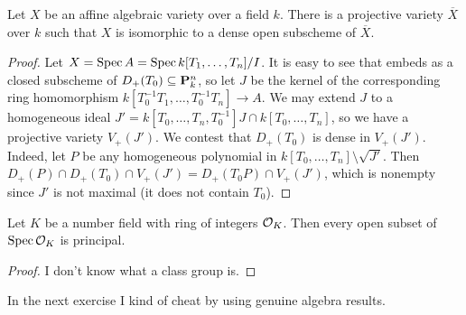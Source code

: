 \begin{exer}
	Let $X$ be an affine algebraic variety over a field $k$. There is a
	projective variety $\overline{X}$ over $k$ such that $X$ is isomorphic
	to a dense open subscheme of $\overline{X}$.
\end{exer}
\begin{proof}
	Let $X = \operatorname{Spec} A = \operatorname{Spec} k[T_1,\ldots,T_n]/I$. It is easy to see that
	embeds as a closed subscheme of $D_+(T_0) \subseteq \mathbf{P}^n_k$, so let
	$J$ be the kernel of the corresponding ring homomorphism
	$k[T_0^{-1}T_1,\ldots,T_0^{-1}T_n] \to A$. We may extend $J$ to a
	homogeneous ideal $J' = k[T_0,\ldots,T_n,T_0^{-1}]J \cap
	k[T_0,\ldots,T_n]$, so we have a projective variety $V_+(J')$. We
	contest that $D_+(T_0)$ is dense in $V_+(J')$. Indeed, let $P$ be any
	homogeneous polynomial in $k[T_0,\ldots,T_n]\setminus\sqrt{J'}$. Then
	$D_+(P) \cap D_+(T_0) \cap V_+(J') = D_+(T_0P) \cap V_+(J')$, which is
	nonempty since $J'$ is not maximal (it does not contain $T_0$).
\end{proof}

\begin{exer}
	Let $K$ be a number field with ring of integers $\mathcal{O}_K$. Then every
	open subset of $\operatorname{Spec} \mathcal{O}_K$ is principal.
\end{exer}
\begin{proof}
	I don't know what a class group is.
\end{proof}

In the next exercise I kind of cheat by using genuine algebra results.

